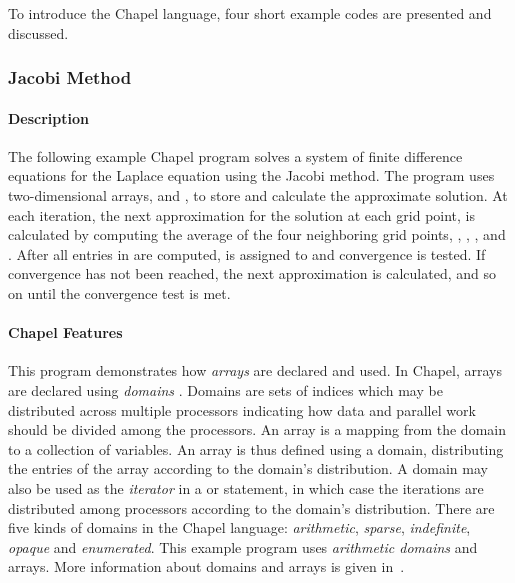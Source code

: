 To introduce the Chapel language, four short example codes are presented and
discussed.  

\subsubsection{Jacobi Method}

\paragraph{Description}
The following example Chapel program solves a system of finite difference
equations for the Laplace equation using the Jacobi method.  The program uses
two-dimensional arrays,  and , to store and calculate the approximate
solution.  At each iteration, the next approximation for the solution at 
each grid point,  is calculated by computing the average of 
the four neighboring grid points,
, , , and .  
After all entries in  are computed,  is assigned to 
and convergence is tested.  If convergence has not been reached, the next
approximation is calculated, and so on until the convergence test is met.

\paragraph{Chapel Features}
This program demonstrates how {\em arrays}  
are declared and used.  In Chapel, 
arrays are declared using {\em domains} .  
Domains are sets of indices which may be distributed
across multiple processors indicating how data and parallel work should
be divided among the processors.  An array is a mapping from the domain
to a collection of variables.  An array is thus defined using a domain, distributing
the entries of the array according to the domain's distribution.
A domain may also be used as the {\em iterator} in a  or
 statement, in which case the iterations are distributed among processors
according to the domain's distribution.  There are five kinds of domains in
the Chapel language:
  {\em arithmetic}, {\em sparse}, {\em indefinite},
{\em opaque} and {\em enumerated}.  This example program uses {\em arithmetic domains}
and arrays.  More information about domains and arrays is given in~.


